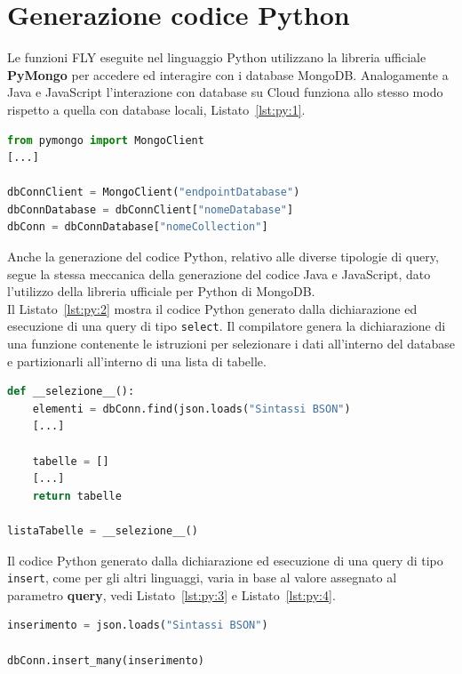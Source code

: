\section{Generazione codice Python}
Le funzioni FLY eseguite nel linguaggio Python utilizzano la libreria ufficiale \textbf{PyMongo} \cite{pymongo} per accedere ed interagire con i database MongoDB. Analogamente a Java e JavaScript l'interazione con database su Cloud funziona allo stesso modo rispetto a quella con database locali, Listato~\ref{lst:py:1}.
\begin{lstlisting}[language=Python,caption={Codice Python generato per la variaibile di tipo nosql.}, label={lst:py:1}]
from pymongo import MongoClient
[...]

dbConnClient = MongoClient("endpointDatabase")
dbConnDatabase = dbConnClient["nomeDatabase"]
dbConn = dbConnDatabase["nomeCollection"]
\end{lstlisting}
Anche la generazione del codice Python, relativo alle diverse tipologie di query, segue la stessa meccanica della generazione del codice Java e JavaScript, dato l'utilizzo della libreria ufficiale per Python di MongoDB. \\
Il Listato~\ref{lst:py:2} mostra il codice Python generato dalla dichiarazione ed esecuzione di una query di tipo \verb|select|. Il compilatore genera la dichiarazione di una funzione contenente le istruzioni per selezionare i dati all'interno del database e partizionarli all'interno di una lista di tabelle.
\begin{lstlisting}[language=Python,caption={Codice Python generato per la variaibile di tipo query per l’esecuzione di un’interrogazione di selezione.}, label={lst:py:2}]
def __selezione__():
	elementi = dbConn.find(json.loads("Sintassi BSON")
	[...]
	
	tabelle = []
	[...]
	return tabelle

listaTabelle = __selezione__()
\end{lstlisting}
Il codice Python generato dalla dichiarazione ed esecuzione di una query di tipo \verb|insert|, come per gli altri linguaggi, varia in base al valore assegnato al parametro \textbf{query}, vedi Listato~\ref{lst:py:3} e Listato~\ref{lst:py:4}.
\begin{lstlisting}[language=Python,caption={Codice Python generato per la variabile di tipo query per l’esecuzione di un’interrogazione di inserimento che utilizza una variabile di tipo stringa.}, label={lst:py:3}]
inserimento = json.loads("Sintassi BSON")

dbConn.insert_many(inserimento)
\end{lstlisting}
